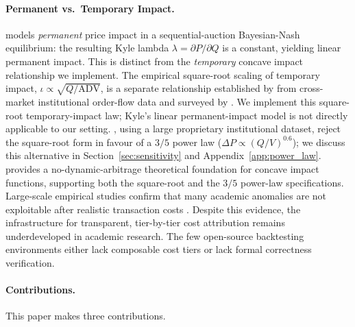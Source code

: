 \documentclass[12pt]{article}
\begin{document}
\paragraph{Permanent vs.\ Temporary Impact.}
\citet{kyle1985continuous} models \emph{permanent} price impact in a
sequential-auction Bayesian-Nash equilibrium: the resulting Kyle lambda
$\lambda = \partial P/\partial Q$ is a constant, yielding linear
permanent impact. This is distinct from the \emph{temporary} concave
impact relationship we implement. The empirical square-root scaling of
temporary impact, $\iota \propto \sqrt{Q/\mathrm{ADV}}$, is a separate
relationship established by \citet{lillo2003master} from cross-market
institutional order-flow data and surveyed by \citet{bouchaud2009theory}.
We implement this square-root temporary-impact law; Kyle's linear
permanent-impact model is not directly applicable to our setting.
\citet{almgren2005direct}, using a large proprietary institutional dataset,
reject the square-root form in favour of a $3/5$ power law
($\Delta P \propto (Q/V)^{0.6}$); we discuss this alternative
in Section~\ref{sec:sensitivity} and Appendix~\ref{app:power_law}.
\citet{gatheral2010no} provides a no-dynamic-arbitrage
theoretical foundation for concave impact functions, supporting both
the square-root and the $3/5$ power-law specifications. Large-scale
empirical studies confirm that many academic anomalies are not
exploitable after realistic transaction costs
\citep{novymarx2016taxonomy, korajczyk2004momentum, patton2020costs,
frazzini2015trading}. Despite this evidence, the infrastructure for
transparent, tier-by-tier cost attribution remains underdeveloped in
academic research. The few open-source backtesting environments either
lack composable cost tiers or lack formal correctness verification.

\paragraph{Contributions.}
This paper makes three contributions.
\end{document}
